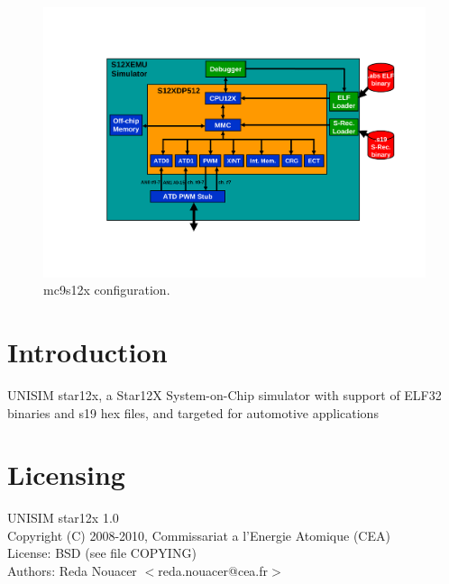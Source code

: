 \begin {figure}[h]
	\centering
		\includegraphics[width=1\textwidth]{mc9s12xdp512/mc9s12xdp512_schema.pdf}
	\caption {mc9s12x configuration.}
	\label {fig:mc9s12xdp512}
\end {figure}

\section{Introduction}
UNISIM star12x, a Star12X System-on-Chip simulator with support of ELF32 binaries and s19 hex files, and targeted for automotive applications
\section{Licensing}
UNISIM star12x 1.0\\
Copyright (C) 2008-2010, Commissariat a l'Energie Atomique (CEA)\\
License: BSD (see file COPYING)\\
Authors: Reda Nouacer $<$reda.nouacer@cea.fr$>$\\
